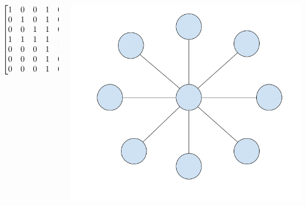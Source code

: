 \begin{frame}[fragile] \frametitle{}
\end{frame}
\begin{frame}[fragile] \frametitle{}
\end{frame}
\begin{frame}[fragile] \frametitle{}
\end{frame}
\begin{frame}[fragile] \frametitle{}
    \vspace{1cm}
    \begin{columns}[T]
        \begin{column}{.48\textwidth}
            $$
            \begin{bmatrix}
                1 & 0 & 0 & 1 & 0 & 0 & 0   \\
                0 & 1 & 0 & 1 & 0 & 0 & 0   \\
                0 & 0 & 1 & 1 & 0 & 0 & 0   \\
                1 & 1 & 1 & 1 & 1 & 1 & 1   \\
                0 & 0 & 0 & 1 & 1 & 0 & 0   \\
                0 & 0 & 0 & 1 & 0 & 1 & 0   \\
                0 & 0 & 0 & 1 & 0 & 0 & 1
            \end{bmatrix}
            $$
        \end{column}
        \hfill
        \begin{column}{.48\textwidth}
            \vspace{-0.2cm}
            \hspace{-0.5cm}
            \includegraphics[scale=0.25]{img/spokes.png}
        \end{column}
    \end{columns}
\end{frame}
